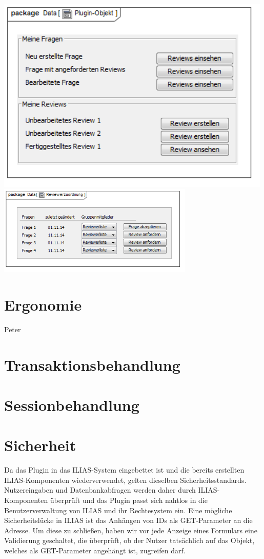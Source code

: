 \documentclass[a4paper]{scrreprt}
\begin{document}
\includegraphics[width=0.99\textwidth]{User_Interface_Modeling_Diagram__Plugin-Objekt.png}
\label{Grafische Benutzeroberfläche Autor}
\\
\includegraphics[width=0.7\textwidth]{User_Interface_Modeling_Diagram__Reviewerzuordnung.png}
\label{Grafische Benutzeroberfläche Autor}
\section{Ergonomie}
{Peter}
\section{Transaktionsbehandlung}
\section{Sessionbehandlung}
\section{Sicherheit}
Da das Plugin in das ILIAS-System eingebettet ist und die bereits erstellten ILIAS-Komponenten wiederverwendet, gelten dieselben Sicherheitsstandards. Nutzereingaben und Datenbankabfragen werden daher durch ILIAS-Komponenten überprüft und das Plugin passt sich nahtlos in die Benutzerverwaltung von ILIAS und ihr Rechtesystem ein. Eine mögliche Sicherheitslücke in ILIAS ist das Anhängen von IDs als GET-Parameter an die Adresse. Um diese zu schließen, haben wir vor jede Anzeige eines Formulars eine Validierung geschaltet, die überprüft, ob der Nutzer tatsächlich auf das Objekt, welches als GET-Parameter angehängt ist, zugreifen darf. 
\end{document}
